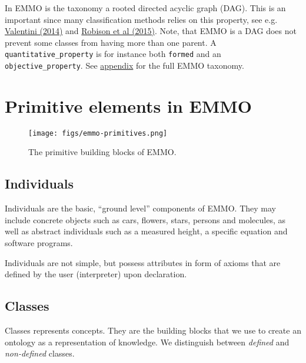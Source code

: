 \documentclass[a4paper,]{report}
\begin{document}
In EMMO is the taxonomy a rooted directed acyclic graph (DAG). This is
an important since many classification methods relies on this property,
see e.g. \href{https://arxiv.org/abs/1406.4472}{Valentini (2014)} and
\href{https://www.google.no/url?sa=t\&rct=j\&q=\&esrc=s\&source=web\&cd=2\&ved=0ahUKEwi_2vv-8tXbAhUFiiwKHVRdD4EQFgg1MAE\&url=https\%3A\%2F\%2Fwww.springer.com\%2Fcda\%2Fcontent\%2Fdocument\%2Fcda_downloaddocument\%2F9783319202471-c2.pdf\%3FSGWID\%3D0-0-45-1510685-p177420182\&usg=AOvVaw39c3v4a5PfVMEYDulWpF3w}{Robison
et al (2015)}. Note, that EMMO is a DAG does not prevent some classes
from having more than one parent. A \texttt{quantitative\_property} is
for instance both \texttt{formed} and an \texttt{objective\_property}.
See \protect\hyperlink{appendix}{appendix} for the full EMMO taxonomy.

\hypertarget{primitive-elements-in-emmo}{%
\section{Primitive elements in EMMO}\label{primitive-elements-in-emmo}}

\begin{figure}
\centering
\texttt{[image: figs/emmo-primitives.png]}
\caption{The primitive building blocks of EMMO.}
\end{figure}

\hypertarget{individuals}{%
\subsection{Individuals}\label{individuals}}

Individuals are the basic, ``ground level'' components of EMMO. They may
include concrete objects such as cars, flowers, stars, persons and
molecules, as well as abstract individuals such as a measured height, a
specific equation and software programs.

Individuals are not simple, but possess attributes in form of axioms
that are defined by the user (interpreter) upon declaration.

\hypertarget{classes}{%
\subsection{Classes}\label{classes}}

Classes represents concepts. They are the building blocks that we use to
create an ontology as a representation of knowledge. We distinguish
between \emph{defined} and \emph{non-defined} classes.
\end{document}
